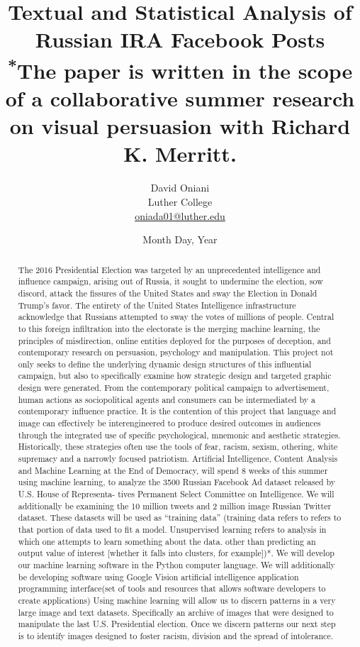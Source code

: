 \documentclass[12pt]{article}
\author{David Oniani\\
        Luther College\\
        \href{mailto:oniada01@luther.edu}{oniada01@luther.edu}}
\title{\textbf{Textual and Statistical Analysis of Russian IRA Facebook Posts}\\
      {\small \textsuperscript{*}The paper is written in the scope of a
                                 collaborative summer research on visual
                                 persuasion with Richard K. Merritt.}}
\date{Month Day, Year}
\theoremstyle{definition}
\begin{document}
\maketitle


\begin{abstract}

\noindent The 2016 Presidential Election was targeted by an unprecedented
intelligence and influence campaign, arising out of Russia, it sought to
undermine the election, sow discord, attack the fissures of the United States
and sway the Election in Donald Trump’s favor. The entirety of the United
States Intelligence infrastructure acknowledge that Russians attempted to sway
the votes of millions of people. Central to this foreign infiltration into the
electorate is the merging machine learning, the principles of misdirection,
online entities deployed for the purposes of deception, and contemporary
research on persuasion, psychology and manipulation. This project not only
seeks to define the underlying dynamic design structures of this influential
campaign, but also to specifically examine how strategic design and targeted
graphic design were generated. From the contemporary political campaign to
advertisement, human actions as sociopolitical agents and consumers can be
intermediated by a contemporary influence practice. It is the contention of
this project that language and image can effectively be interengineered to
produce desired outcomes in audiences through the integrated use of specific
psychological, mnemonic and aesthetic strategies. Historically, these
strategies often use the tools of fear, racism, sexism, othering, white
supremacy and a narrowly focused patriotism. Artificial Intelligence, Content
Analysis and Machine Learning at the End of Democracy, will spend 8 weeks of
this summer using machine learning, to analyze the 3500 Russian Facebook Ad
dataset released by U.S. House of Representa- tives Permanent Select Committee
on Intelligence. We will additionally be examining the 10 million tweets and
2 million image Russian Twitter dataset. These datasets will be used as
“training data” (training data refers to refers to that portion of data used
to fit a model. Unsupervised learning refers to analysis in which one attempts
to learn something about the data. other than predicting an output value of
interest [whether it falls into clusters, for example])*. We will develop our
machine learning software in the Python computer language. We will additionally
be developing software using Google Vision artificial intelligence application
programming interface(set of tools and resources that allows software
developers to create applications) Using machine learning will allow us to
discern patterns in a very large image and text datasets. Specifically an
archive of images that were designed to manipulate the last U.S. Presidential
election. Once we discern patterns our next step is to identify images designed
to foster racism, division and the spread of intolerance.
\end{abstract}
\end{document}
